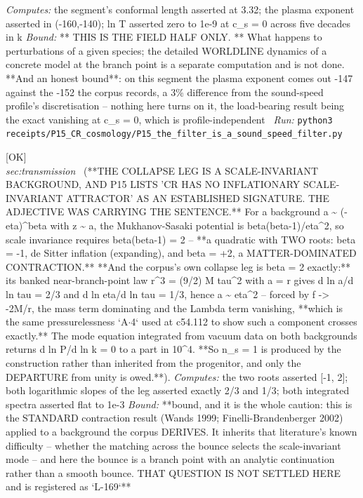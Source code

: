 \begin{description}
\emph{Computes:} the segment's conformal length asserted at 3.32; the plasma exponent asserted in (-160,-140); ln T asserted zero to 1e-9 at c\_s = 0 across five decades in k
 \emph{Bound:} ** THIS IS THE FIELD HALF ONLY. ** What happens to perturbations of a given species; the detailed WORLDLINE dynamics of a concrete model at the branch point is a separate computation and is not done. **And an honest bound**: on this segment the plasma exponent comes out -147 against the -152 the corpus records, a 3\% difference from the sound-speed profile's discretisation -- nothing here turns on it, the load-bearing result being the exact vanishing at c\_s = 0, which is profile-independent
\ \emph{Run:} \texttt{python3 receipts/P15\_CR\_cosmology/P15\_the\_filter\_is\_a\_sound\_speed\_filter.py}
\item[\label{rcpt:P15_the_collapse_leg_is_scale_invariant}\texttt{P15\_the\_collapse\_leg\_is\_scale\_invariant}]\hfill\textsf{[OK]}\\
\textit{sec:transmission} \ (**THE COLLAPSE LEG IS A SCALE-INVARIANT BACKGROUND, AND P15 LISTS 'CR HAS NO INFLATIONARY SCALE-INVARIANT ATTRACTOR' AS AN ESTABLISHED SIGNATURE. THE ADJECTIVE WAS CARRYING THE SENTENCE.** For a background a \textasciitilde{} (-eta)\textasciicircum{}beta with z \textasciitilde{} a, the Mukhanov-Sasaki potential is beta(beta-1)/eta\textasciicircum{}2, so scale invariance requires beta(beta-1) = 2 -- **a quadratic with TWO roots: beta = -1, de Sitter inflation (expanding), and beta = +2, a MATTER-DOMINATED CONTRACTION.** **And the corpus's own collapse leg is beta = 2 exactly:** its banked near-branch-point law r\textasciicircum{}3 = (9/2) M tau\textasciicircum{}2 with a = \textbar{}r\textbar{} gives d ln a/d ln tau = 2/3 and d ln eta/d ln tau = 1/3, hence a \textasciitilde{} eta\textasciicircum{}2 -- forced by f -> -2M/r, the mass term dominating and the Lambda term vanishing, **which is the same pressurelessness `A\ensuremath{\cdot}4` used at c54.112 to show such a component crosses exactly.** The mode equation integrated from vacuum data on both backgrounds returns d ln P/d ln k = 0 to a part in 10\textasciicircum{}4. **So n\_s = 1 is produced by the construction rather than inherited from the progenitor, and only the DEPARTURE from unity is owed.**). 
\emph{Computes:} the two roots asserted [-1, 2]; both logarithmic slopes of the leg asserted exactly 2/3 and 1/3; both integrated spectra asserted flat to 1e-3
 \emph{Bound:} **bound, and it is the whole caution: this is the STANDARD contraction result (Wands 1999; Finelli-Brandenberger 2002) applied to a background the corpus DERIVES. It inherits that literature's known difficulty -- whether the matching across the bounce selects the scale-invariant mode -- and here the bounce is a branch point with an analytic continuation rather than a smooth bounce. THAT QUESTION IS NOT SETTLED HERE and is registered as `L-169`**

\end{description}
